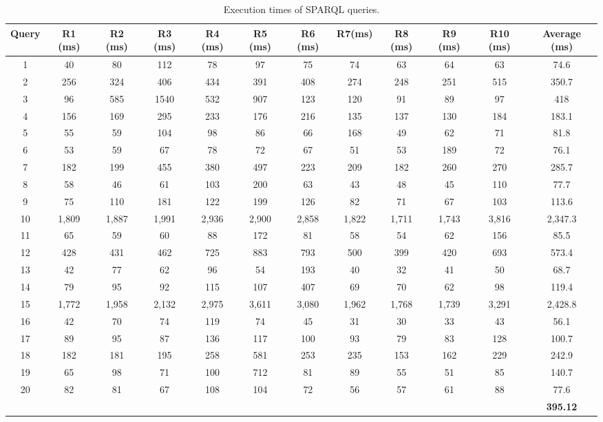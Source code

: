 \documentclass[twocolumn]{svjour3}
\begin{document}
\begin{table}[]
\centering
\caption{Execution times of SPARQL queries.}
\vspace{-1mm}
\setlength{\tabcolsep}{3pt}
\label{tbl:exec_time}
\begin{tabular}{|c|c|c|c|c|c|c|c|c|c|c|c|}
\hline
\rowcolor[HTML]{EFEFEF}
{\color[HTML]{000000} {\bf Query}} & {\color[HTML]{000000} R1 (ms)} & {\color[HTML]{000000} R2 (ms)} & {\color[HTML]{000000} R3 (ms)} & R4 (ms) & R5 (ms) & R6 (ms) & R7(ms) & R8 (ms) & R9 (ms) & R10 (ms) & {\bf Average (ms)} \\ \hline
1 & 40 & 80 & 112 & 78 & 97 & 75 & 74 & 63 & 64 & 63 & 74.6 \\ \hline
2 & 256 & 324 & 406 & 434 & 391 & 408 & 274 & 248 & 251 & 515 & 350.7 \\ \hline
3 & 96 & 585 & 1540 & 532 & 907 & 123 & 120 & 91 & 89 & 97 & 418 \\ \hline
4 & 156 & 169 & 295 & 233 & 176 & 216 & 135 & 137 & 130 & 184 & 183.1 \\ \hline
5 & 55 & 59 & 104 & 98 & 86 & 66 & 168 & 49 & 62 & 71 & 81.8 \\ \hline
6 & 53 & 59 & 67 & 78 & 72 & 67 & 51 & 53 & 189 & 72 & 76.1 \\ \hline
7 & 182 & 199 & 455 & 380 & 497 & 223 & 209 & 182 & 260 & 270 & 285.7 \\ \hline
8 & 58 & 46 & 61 & 103 & 200 & 63 & 43 & 48 & 45 & 110 & 77.7 \\ \hline
9 & 75 & 110 & 181 & 122 & 199 & 126 & 82 & 71 & 67 & 103 & 113.6 \\ \hline
10 & 1,809 & 1,887 & 1,991 & 2,936 & 2,900 & 2,858 & 1,822 & 1,711 & 1,743 & 3,816 & 2,347.3 \\ \hline
11 & 65 & 59 & 60 & 88 & 172 & 81 & 58 & 54 & 62 & 156 & 85.5 \\ \hline
12 & 428 & 431 & 462 & 725 & 883 & 793 & 500 & 399 & 420 & 693 & 573.4 \\ \hline
13 & 42 & 77 & 62 & 96 & 54 & 193 & 40 & 32 & 41 & 50 & 68.7 \\ \hline
14 & 79 & 95 & 92 & 115 & 107 & 407 & 69 & 70 & 62 & 98 & 119.4 \\ \hline
15 & 1,772 & 1,958 & 2,132 & 2,975 & 3,611 & 3,080 & 1,962 & 1,768 & 1,739 & 3,291 & 2,428.8 \\ \hline
16 & 42 & 70 & 74 & 119 & 74 & 45 & 31 & 30 & 33 & 43 & 56.1 \\ \hline
17 & 89 & 95 & 87 & 136 & 117 & 100 & 93 & 79 & 83 & 128 & 100.7 \\ \hline
18 & 182 & 181 & 195 & 258 & 581 & 253 & 235 & 153 & 162 & 229 & 242.9 \\ \hline
19 & 65 & 98 & 71 & 100 & 712 & 81 & 89 & 55 & 51 & 85 & 140.7 \\ \hline
20 & 82 & 81 & 67 & 108 & 104 & 72 & 56 & 57 & 61 & 88 & 77.6 \\ \hline
\multicolumn{11}{|r|}{\cellcolor[HTML]{EFEFEF}{\bf Average (ms):}} & {\bf 395.12} \\ \hline
\end{tabular}
\end{table}
\end{document}
